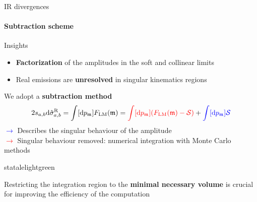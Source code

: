 
\begin{frame} {IR divergences}
 \framesubtitle{Subtraction scheme}
Insights \\
\begin{itemize}
    \item \textbf{Factorization} of the amplitudes in the soft and collinear limits 
    \item Real emissions are \textbf{unresolved} in singular kinematics regions
\end{itemize}
 \vspace{1.em}
 We adopt a \textbf{subtraction method}
\begin{equation*}
    2s_{a,b} \mathrm{d} \hat{\sigma}_{a,b}^{\mathrm{R}} = \int [\mathrm{d}p_{\mathfrak{m}}] F_{\mathrm{LM}} (\mathfrak{m})=  \textcolor{red}{\int [\mathrm{d}p_{\mathfrak{m}}] (F_{\mathrm{LM}}(\mathfrak{m}) - \mathcal{S})}  + \textcolor{blue}{\int [\mathrm{d}p_{\mathfrak{m}}] \mathcal{S}}
    \label{subtraction-flm}
\end{equation*}
\textcolor{blue}{$\to$} Describes the singular behaviour of the amplitude\\ 
\textcolor{red}{$\to$} Singular behaviour removed: numerical integration with Monte Carlo methods \\


\begin{colorblock}[black]{statalelightgreen}{}
\begin{center}
    Restricting the integration region to the \textbf{minimal necessary volume} is crucial for improving the efficiency of the computation
\end{center}
            
      \end{colorblock}


\end{frame}


